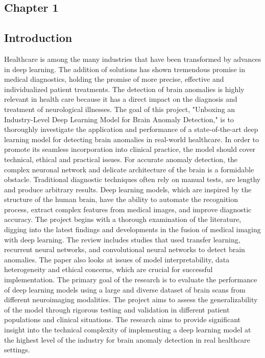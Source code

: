 \begin{center}
  \chapter{{\huge \textbf{Chapter 1}}}
\end{center}
\section{Introduction}
Healthcare is among the many industries that have been transformed by advances in deep learning. The addition of solutions has shown tremendous promise in medical diagnostics, holding the promise of more precise, effective and individualized patient treatments. The detection of brain anomalies is highly relevant in health care because it has a direct impact on the diagnosis and treatment of neurological illnesses. The goal of this project, "Unboxing an Industry-Level Deep Learning Model for Brain Anomaly Detection," is to thoroughly investigate the application and performance of a state-of-the-art deep learning model for detecting brain anomalies in real-world healthcare. In order to promote its seamless incorporation into clinical practice, the model should cover technical, ethical and practical issues. For accurate anomaly detection, the complex neuronal network and delicate architecture of the brain is a formidable obstacle. Traditional diagnostic techniques often rely on manual tests, are lengthy and produce arbitrary results. Deep learning models, which are inspired by the structure of the human brain, have the ability to automate the recognition process, extract complex features from medical images, and improve diagnostic accuracy. The project begins with a thorough examination of the literature, digging into the latest findings and developments in the fusion of medical imaging with deep learning. The review includes studies that used transfer learning, recurrent neural networks, and convolutional neural networks to detect brain anomalies. The paper also looks at issues of model interpretability, data heterogeneity and ethical concerns, which are crucial for successful implementation. The primary goal of the research is to evaluate the performance of deep learning models using a large and diverse dataset of brain scans from different neuroimaging modalities. The project aims to assess the generalizability of the model through rigorous testing and validation in different patient populations and clinical situations. The research aims to provide significant insight into the technical complexity of implementing a deep learning model at the highest level of the industry for brain anomaly detection in real healthcare settings.
